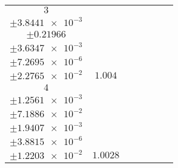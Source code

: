 \documentclass[8pt]{article}
\begin{document}
\begin{longtable}[l]{c c c c c c c}
$\num{3}$ & \begin{tabular}[c]{@{}c@{}}$\num{1.0026}$ \\ $\pm\num{3.8441e-3}$\end{tabular} & \begin{tabular}[c]{@{}c@{}}$\num{-2.4786e-2}$ \\ $\pm\num{0.21966}$\end{tabular} & \begin{tabular}[c]{@{}c@{}}$\num{1.9612e+3}$ \\ $\pm\num{3.6347e-3}$\end{tabular} & \begin{tabular}[c]{@{}c@{}}$\num{3.9224}$ \\ $\pm\num{7.2695e-6}$\end{tabular} & \begin{tabular}[c]{@{}c@{}}$\num{7.0301}$ \\ $\pm\num{2.2765e-2}$\end{tabular} & $\num{1.004}$\\
$\num{4}$ & \begin{tabular}[c]{@{}c@{}}$\num{1.0009}$ \\ $\pm\num{1.2561e-3}$\end{tabular} & \begin{tabular}[c]{@{}c@{}}$\num{-6.9312e-2}$ \\ $\pm\num{7.1886e-2}$\end{tabular} & \begin{tabular}[c]{@{}c@{}}$\num{1.9814e+3}$ \\ $\pm\num{1.9407e-3}$\end{tabular} & \begin{tabular}[c]{@{}c@{}}$\num{3.9628}$ \\ $\pm\num{3.8815e-6}$\end{tabular} & \begin{tabular}[c]{@{}c@{}}$\num{7.0042}$ \\ $\pm\num{1.2203e-2}$\end{tabular} & $\num{1.0028}$\\
\bottomrule
\end{longtable}
\end{document}
